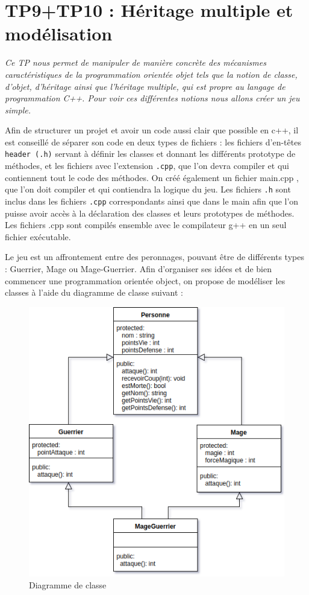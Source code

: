 \chapter{TP9+TP10 : Héritage multiple et modélisation}
\textit{Ce TP nous permet de manipuler de manière concrète des mécanismes caractéristiques de la programmation orientée objet tels que la notion de classe, d’objet, d’héritage ainsi que l’héritage multiple, qui est propre au langage de programmation C++.
Pour voir ces différentes notions nous allons créer un jeu simple.}

Afin de structurer un projet et avoir un code aussi clair que possible en c++, il est conseillé de séparer son
code en deux types de fichiers : les fichiers d’en-têtes \texttt{header (.h)} servant à définir les classes et
donnant les différents prototype de méthodes, et les fichiers avec l’extension \texttt{.cpp}, que l’on devra compiler et qui contiennent tout le code des méthodes. On créé également un fichier main.cpp , que l’on doit compiler et qui contiendra la logique du jeu.
Les fichiers \texttt{.h} sont inclus dans les fichiers \texttt{.cpp} correspondants ainsi que dans le main afin que l’on puisse avoir accès à la déclaration des classes et leurs prototypes de méthodes.
Les fichiers .cpp sont compilés ensemble avec le compilateur g++ en un seul fichier exécutable.

Le jeu est un affrontement entre des peronnages, pouvant être de différents types : Guerrier, Mage ou Mage-Guerrier.
Afin d'organiser ses idées et de bien commencer une programmation orientée object, on propose de modéliser les classes à l'aide du diagramme de classe suivant :

\begin{figure}[H]
\centering
\includegraphics[width=400pt]{./cpp/Pictures/tp9+10-inheritance}
\caption{Diagramme de classe}
\label{Diagramme de classe}
\end{figure}

